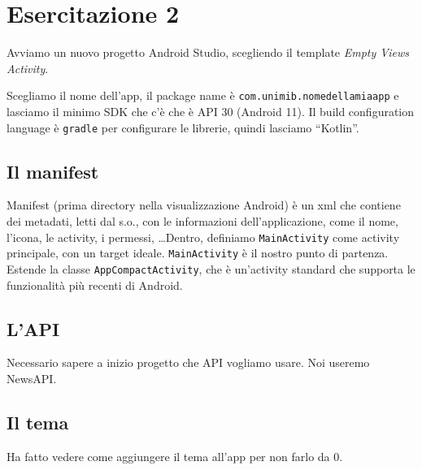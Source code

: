 
\chapter{Esercitazione 2}
\par Avviamo un nuovo progetto Android Studio, scegliendo il template \textit{Empty Views Activity}.
\par Scegliamo il nome dell'app, il package name è \texttt{com.unimib.nomedellamiaapp} e lasciamo il minimo SDK che c'è che è API 30 (Android 11). Il build configuration language è \texttt{gradle} per configurare le librerie, quindi lasciamo ``Kotlin''.

\section{Il manifest}
\par Manifest (prima directory nella visualizzazione Android) è un xml che contiene dei metadati, letti dal s.o., con le informazioni dell'applicazione, come il nome, l'icona, le activity, i permessi, \dots Dentro, definiamo \texttt{MainActivity} come activity principale, con un target ideale. \texttt{MainActivity} è il nostro punto di partenza. Estende la classe \texttt{AppCompactActivity}, che è un'activity standard che supporta le funzionalità più recenti di Android.

\section{L'API}
\par Necessario sapere a inizio progetto che API vogliamo usare. Noi useremo NewsAPI. 

\section{Il tema}
\par Ha fatto vedere come aggiungere il tema all'app per non farlo da 0.


